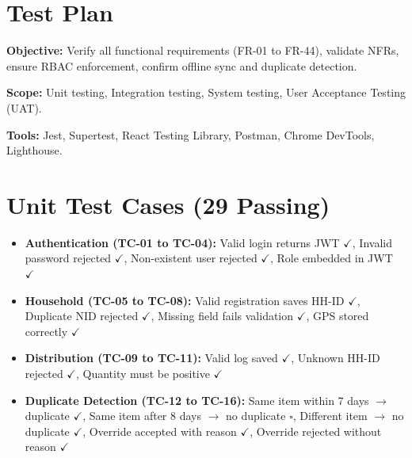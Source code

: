 
\section{Test Plan}
\textbf{Objective:} Verify all functional requirements (FR-01 to FR-44), validate NFRs, ensure RBAC enforcement, confirm offline sync and duplicate detection.

\textbf{Scope:} Unit testing, Integration testing, System testing, User Acceptance Testing (UAT).

\textbf{Tools:} Jest, Supertest, React Testing Library, Postman, Chrome DevTools, Lighthouse.

\section{Unit Test Cases (29 Passing)}
\begin{itemize}[nosep]
    \item \textbf{Authentication (TC-01 to TC-04):} Valid login returns JWT $\checkmark$, Invalid password rejected $\checkmark$, Non-existent user rejected $\checkmark$, Role embedded in JWT $\checkmark$
    \item \textbf{Household (TC-05 to TC-08):} Valid registration saves HH-ID $\checkmark$, Duplicate NID rejected $\checkmark$, Missing field fails validation $\checkmark$, GPS stored correctly $\checkmark$
    \item \textbf{Distribution (TC-09 to TC-11):} Valid log saved $\checkmark$, Unknown HH-ID rejected $\checkmark$, Quantity must be positive $\checkmark$
    \item \textbf{Duplicate Detection (TC-12 to TC-16):} Same item within 7 days $\rightarrow$ duplicate $\checkmark$, Same item after 8 days $\rightarrow$ no duplicate $\square$, Different item $\rightarrow$ no duplicate $\checkmark$, Override accepted with reason $\checkmark$, Override rejected without reason $\checkmark$
\end{itemize}

